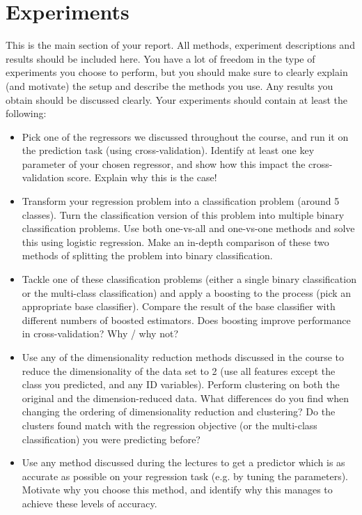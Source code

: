 \documentclass[runningheads]{llncs}
\begin{document}
\section{Experiments}\label{lab:exp}
This is the main section of your report. All methods, experiment descriptions and results should be included here. You have a lot of freedom in the type of experiments you choose to perform, but you should make sure to clearly explain (and motivate) the setup and describe the methods you use. Any results you obtain should be discussed clearly.
Your experiments should contain at least the following:
\begin{itemize}
    \item Pick one of the regressors we discussed throughout the course, and run it on the prediction task (using cross-validation). Identify at least one key parameter of your chosen regressor, and show how this impact the cross-validation score. Explain why this is the case! 
    \item Transform your regression problem into a classification problem (around 5 classes). Turn the classification version of this problem into multiple binary classification problems. Use both one-vs-all and one-vs-one methods and solve this using logistic regression. Make an in-depth comparison of these two methods of splitting the problem into binary classification. 
    \item Tackle one of these classification problems (either a single binary classification or the multi-class classification) and apply a boosting to the process (pick an appropriate base classifier). Compare the result of the base classifier with different numbers of boosted estimators. Does boosting improve performance in cross-validation? Why / why not?
    \item Use any of the dimensionality reduction methods discussed in the course to reduce the dimensionality of the data set to 2 (use all features except the class you predicted, and any ID variables). Perform clustering on both the original and the dimension-reduced data. What differences do you find when changing the ordering of dimensionality reduction and clustering? Do the clusters found match with the regression objective (or the multi-class classification) you were predicting before?  
    \item Use any method discussed during the lectures to get a predictor which is as accurate as possible on your regression task (e.g. by tuning the parameters). Motivate why you choose this method, and identify why this manages to achieve these levels of accuracy. 
\end{itemize}
\end{document}
